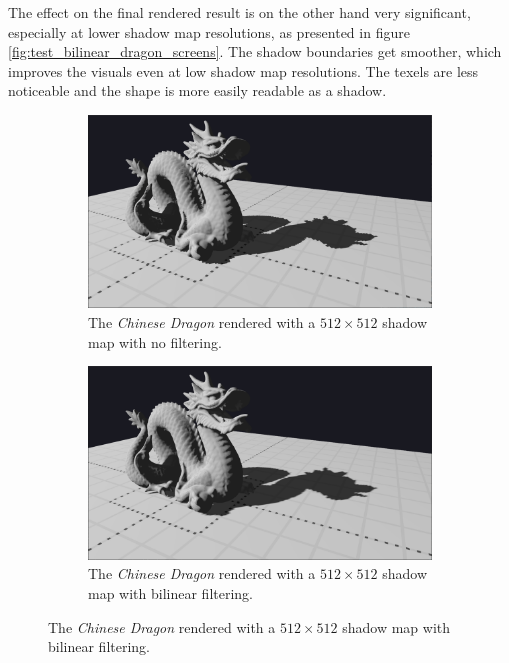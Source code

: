 The effect on the final rendered result is on the other hand very significant, especially at lower shadow map resolutions, as presented in figure \ref{fig:test_bilinear_dragon_screens}. The shadow boundaries get smoother, which improves the visuals even at low shadow map resolutions. The texels are less noticeable and the shape is more easily readable as a shadow.

\begin{figure}[h]
    \centering
    \begin{subfigure}[t]{0.48\textwidth}
		\centering
        \includegraphics[width=\textwidth]{./graf/tests/basic/cropped/dragon_basic_fhd_512.png}
        \caption{The \textit{Chinese Dragon} rendered with a \(512\times 512\) shadow map with no filtering.}
    \end{subfigure}
	\hfill
    \begin{subfigure}[t]{0.48\textwidth}
		\centering
        \includegraphics[width=\textwidth]{./graf/tests/bilinear/cropped/dragon_bilinear_fhd_512.png}
        \caption{The \textit{Chinese Dragon} rendered with a \(512\times 512\) shadow map with bilinear filtering.}
    \end{subfigure}

\end{figure}
